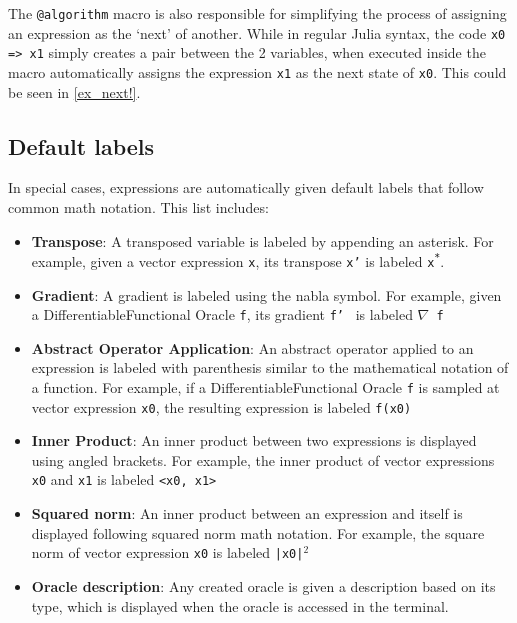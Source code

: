 The \texttt{@algorithm} macro is also responsible for simplifying the process of assigning an expression as the `next' of another. While in regular Julia syntax, the code \texttt{x0 => x1} simply creates a pair between the 2 variables, when executed inside the macro automatically assigns the expression \texttt{x1} as the next state of \texttt{x0}. This could be seen in \cref{ex_next!}.

\subsection*{Default labels}
In special cases, expressions are automatically given default labels that follow common math notation. This list includes:

\begin{itemize}
	\item \textbf{Transpose}: A transposed variable is labeled by appending an asterisk.
 For example, given a vector expression \texttt{x}, its transpose \texttt{x'} is labeled \texttt{x\textsuperscript{*}}.

	\item \textbf{Gradient}: A gradient is labeled using the nabla symbol. For example, given a DifferentiableFunctional Oracle \texttt{f}, its gradient \texttt{f'}  is labeled \texttt{$\nabla$ f}

    \item \textbf{Abstract Operator Application}: An abstract operator applied to an expression is labeled with parenthesis similar to the mathematical notation of a function. For example, if a DifferentiableFunctional Oracle \texttt{f} is sampled at vector expression \texttt{x0}, the resulting expression is labeled \texttt{f(x0)}


    \item \textbf{Inner Product}: An inner product between two expressions is displayed using angled brackets. For example, the inner product of vector expressions \texttt{x0} and \texttt{x1} is labeled \texttt{<x0, x1>}
	\item \textbf{Squared norm}: An inner product between an expression and itself is displayed following squared norm math notation. For example, the square norm of vector expression \texttt{x0} is labeled \texttt{|x0|$^2$}
	\item \textbf{Oracle description}: Any created oracle is given a description based on its type, which is displayed when the oracle is accessed in the terminal.
	

\end{itemize}
